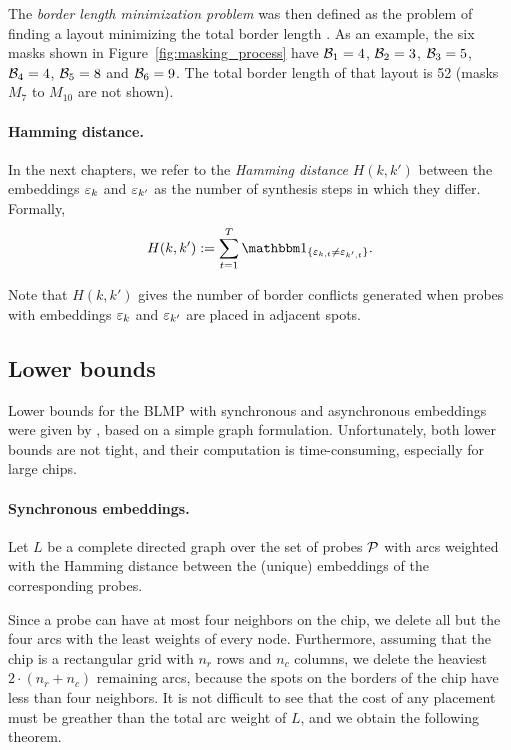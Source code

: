 The \emph{border length minimization problem} was then defined as the problem of
finding a layout minimizing the total border length \citep{Hannenhalli2002}. As
an example, the six masks shown in Figure~\ref{fig:masking_process} have
${\mathcal{B}}_1 = 4$, ${\mathcal{B}}_2 = 3$, ${\mathcal{B}}_3 = 5$, ${\mathcal{B}}_4 = 4$, ${\mathcal{B}}_5 = 8$ and
${\mathcal{B}}_6 = 9$. The total border length of that layout is 52 (masks $M_7$ to
$M_{10}$ are not shown).

\paragraph{Hamming distance.}
In the next chapters, we refer to the \emph{Hamming distance} $H(k,k')$ between
the embeddings $\varepsilon_k$ and $\varepsilon_{k'}$ as the number of synthesis steps in
which they differ. Formally,
\begin{equation}\label{eq:hamming}
  H(k,k') := \sum_{t=1}^{T} \Ind{\eps_{k,t} \neq \eps_{k',t}}.
\end{equation}

Note that $H(k,k')$ gives the number of border conflicts generated when probes
with embeddings $\varepsilon_k$ and $\varepsilon_{k'}$ are placed in adjacent spots.

\subsection{Lower bounds}

Lower bounds for the BLMP with synchronous and asynchronous embeddings were
given by \citet{Kahng2002}, based on a simple graph formulation. Unfortunately,
both lower bounds are not tight, and their computation is time-consuming,
especially for large chips.

\paragraph{Synchronous embeddings.}
Let $L$ be a complete directed graph over the set of probes ${\mathcal{P}}$ with arcs
weighted with the Hamming distance between the (unique) embeddings of the
corresponding probes.

Since a probe can have at most four neighbors on the chip, we delete all but the
four arcs with the least weights of every node. Furthermore, assuming that the
chip is a rectangular grid with $n_r$ rows and $n_c$ columns, we delete the
heaviest $2 \cdot (n_r + n_c)$ remaining arcs, because the spots on the borders
of the chip have less than four neighbors. It is not difficult to see that the
cost of any placement must be greather than the total arc weight of $L$, and we
obtain the following theorem.

